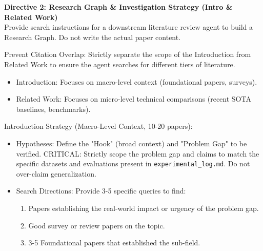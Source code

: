 \vspace{1em}
\noindent\textbf{Directive 2: Research Graph \& Investigation Strategy (Intro \& Related Work)}\\
\vspace{0.5em}
Provide search instructions for a downstream literature review agent to build a Research Graph. Do not write the actual paper content.

\vspace{0.5em}

\noindent Prevent Citation Overlap: Strictly separate the scope of the Introduction from Related Work to ensure the agent searches for different tiers of literature.
\begin{itemize}
    \item Introduction: Focuses on macro-level context (foundational papers, surveys).
    \item Related Work: Focuses on micro-level technical comparisons (recent SOTA baselines, benchmarks). 
\end{itemize}

\noindent Introduction Strategy (Macro-Level Context, 10-20 papers):
\begin{itemize}
    \item Hypotheses: Define the "Hook" (broad context) and "Problem Gap" to be verified. CRITICAL: Strictly scope the problem gap and claims to match the specific datasets and evaluations present in \texttt{experimental\_log.md}. Do not over-claim generalization.
    \item Search Directions: Provide 3-5 specific queries to find: 
    \begin{enumerate}
        \item Papers establishing the real-world impact or urgency of the problem gap.
        \item Good survey or review papers on the topic.
        \item 3-5 Foundational papers that established the sub-field.
    \end{enumerate}
\end{itemize}

